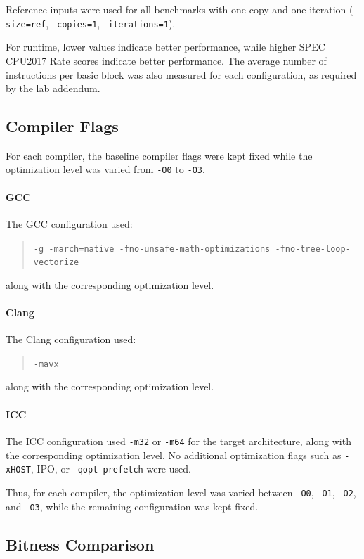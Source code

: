 \documentclass[11pt,a4paper]{article}
\begin{document}
Reference inputs were used for all benchmarks with one copy and one iteration (\texttt{--size=ref}, \texttt{--copies=1}, \texttt{--iterations=1}).

For runtime, lower values indicate better performance, while higher SPEC CPU2017 Rate scores indicate better performance. The average number of instructions per basic block was also measured for each configuration, as required by the lab addendum.


\subsection{Compiler Flags}
\label{sec:flags}

For each compiler, the baseline compiler flags were kept fixed while the optimization level was varied from \texttt{-O0} to \texttt{-O3}.

\paragraph{GCC}
The GCC configuration used:
\begin{quote}
\texttt{-g -march=native -fno-unsafe-math-optimizations -fno-tree-loop-vectorize}
\end{quote}
along with the corresponding optimization level.

\paragraph{Clang}
The Clang configuration used:
\begin{quote}
\texttt{-mavx}
\end{quote}
along with the corresponding optimization level.

\paragraph{ICC}
The ICC configuration used \texttt{-m32} or \texttt{-m64} for the target architecture, along with the corresponding optimization level. No additional optimization flags such as \texttt{-xHOST}, IPO, or \texttt{-qopt-prefetch} were used.

Thus, for each compiler, the optimization level was varied between \texttt{-O0}, \texttt{-O1}, \texttt{-O2}, and \texttt{-O3}, while the remaining configuration was kept fixed.


\subsection{Bitness Comparison}
\end{document}
